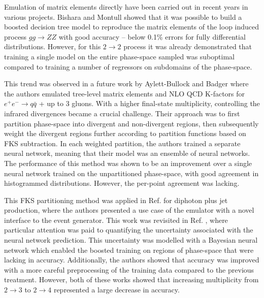 \documentclass[main.tex]{subfiles}
\begin{document}
    Emulation of matrix elements directly have been
    carried out in recent years in various projects.
    Bishara and Montull showed \cite{Bishara:2019iwh} that it was possible to
    build a boosted decision tree model to reproduce
    the matrix elements of the loop induced process $gg \rightarrow ZZ$ with good accuracy --
    below 0.1\% errors for fully differential distributions.
    However, for this $2 \rightarrow 2$ process it was already demonstrated
    that training a single model on the entire phase-space sampled
    was suboptimal compared to training a number of regressors
    on subdomains of the phase-space.

    This trend was observed in a future work by Aylett-Bullock
    and Badger \cite{Badger:2020uow} where the authors emulated tree-level
    matrix elements and NLO QCD K-factors for $e^{+}e^{-} \rightarrow q \bar{q}$ +
    up to 3 gluons. With a higher final-state multiplicity, controlling
    the infrared divergences became a crucial challenge.
    Their approach was to first partition phase-space
    into divergent and non-divergent regions, then subsequently
    weight the divergent regions further according to partition functions
    based on FKS subtraction.
    In each weighted partition, the authors trained a separate neural network,
    meaning that their model was an ensemble of neural networks.
    The performance of this method was shown to be an improvement
    over a single neural network trained on the unpartitioned phase-space,
    with good agreement in histogrammed distributions. However,
    the per-point agreement was lacking.

    This FKS partitioning method was applied in Ref. \cite{Aylett-Bullock:2021hmo}
    for diphoton plus jet production, where the authors presented a
    use case of the emulator with a novel interface to the {\Sherpa} event generator.
    This work was revisited in Ref. \cite{Badger:2022hwf},
    where particular attention was paid to quantifying the uncertainty associated
    with the neural network prediction. This uncertainty was
    modelled with a Bayesian neural network which enabled
    the boosted training on regions of phase-space that were
    lacking in accuracy. Additionally, the authors showed
    that accuracy was improved with a more careful
    preprocessing of the training data compared to
    the previous treatment.
    However, both of these works showed that increasing
    multiplicity from $2 \rightarrow 3$ to $2 \rightarrow 4$
    represented a large decrease in accuracy.
\end{document}
